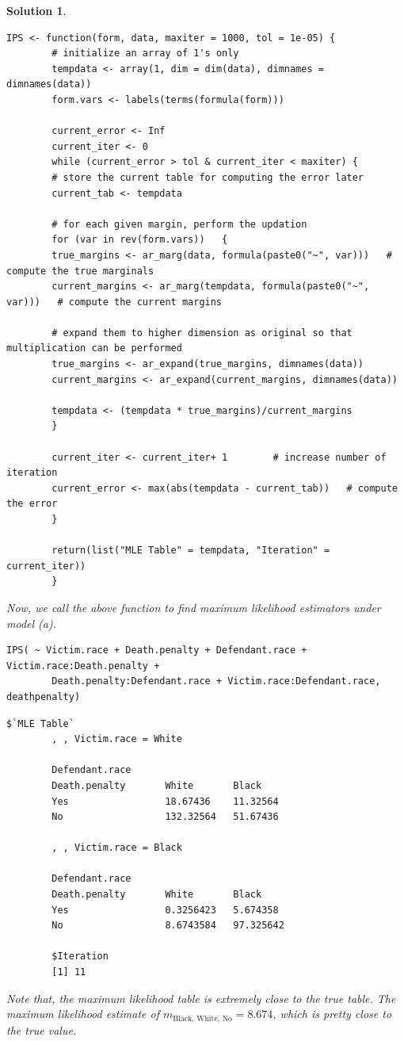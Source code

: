 \documentclass[12pt]{article}
\theoremstyle{problemstyle}
\newtheorem*{solution*}{Solution}
\begin{document}
\begin{solution*}
\begin{enumerate}
	\begin{lstlisting}[style = R-code]
		IPS <- function(form, data, maxiter = 1000, tol = 1e-05) {
		# initialize an array of 1's only
		tempdata <- array(1, dim = dim(data), dimnames = dimnames(data))
		form.vars <- labels(terms(formula(form)))
		
		current_error <- Inf
		current_iter <- 0
		while (current_error > tol & current_iter < maxiter) {
		# store the current table for computing the error later
		current_tab <- tempdata
		
		# for each given margin, perform the updation
		for (var in rev(form.vars))   {
		true_margins <- ar_marg(data, formula(paste0("~", var)))   # compute the true marginals
		current_margins <- ar_marg(tempdata, formula(paste0("~", var)))   # compute the current margins
		
		# expand them to higher dimension as original so that multiplication can be performed
		true_margins <- ar_expand(true_margins, dimnames(data))    
		current_margins <- ar_expand(current_margins, dimnames(data))
		
		tempdata <- (tempdata * true_margins)/current_margins
		}
		
		current_iter <- current_iter+ 1        # increase number of iteration
		current_error <- max(abs(tempdata - current_tab))   # compute the error
		}
		
		return(list("MLE Table" = tempdata, "Iteration" = current_iter))
		}
	\end{lstlisting}
	
	Now, we call the above function to find maximum likelihood estimators under model (a).
	\begin{lstlisting}[style = R-code]
		IPS( ~ Victim.race + Death.penalty + Defendant.race + Victim.race:Death.penalty + 
		Death.penalty:Defendant.race + Victim.race:Defendant.race, deathpenalty)
	\end{lstlisting}
	\begin{lstlisting}[style = R-output]
		$`MLE Table`
		, , Victim.race = White
		
		Defendant.race
		Death.penalty     	White    	Black
		Yes  				18.67436 	11.32564
		No  				132.32564 	51.67436
		
		, , Victim.race = Black
		
		Defendant.race
		Death.penalty     	White     	Black
		Yes 				0.3256423  	5.674358
		No  				8.6743584 	97.325642
		
		$Iteration
		[1] 11
	\end{lstlisting}
	Note that, the maximum likelihood table is extremely close to the true table. The maximum likelihood estimate of $m_{\text{Black, White, No}} = 8.674$, which is pretty close to the true value.
	

\end{enumerate}
\end{solution*}
\end{document}
